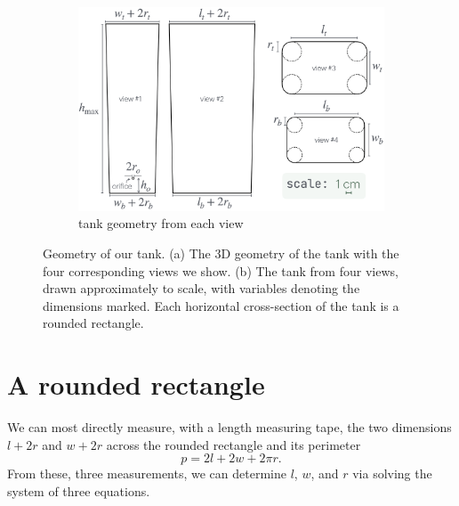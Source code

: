 \documentclass[a4paper,fleqn]{cas-sc}
\begin{document}
\begin{figure}[h!]
	\begin{subfigure}[b]{0.8\textwidth}
		\includegraphics[width=\textwidth]{../drawings_and_photos/tank_geometry.png} \caption{tank geometry from each view}
	\end{subfigure}
	\caption{Geometry of our tank. 
	(a) The 3D geometry of the tank with the four corresponding views we show. (b) The tank from four views, drawn approximately to scale, with variables denoting the dimensions marked. Each horizontal cross-section of the tank is a rounded rectangle.
	} \label{fig:tank_geometry}
\end{figure}

\clearpage

\section{A rounded rectangle}
We can most directly measure, with a length measuring tape, the two dimensions $l+2r$ and $w+2r$ across the rounded rectangle and its perimeter 
\begin{equation}
p = 2 l + 2 w + 2 \pi r.
\end{equation}
From these, three measurements, we can determine $l$, $w$, and $r$ via solving the system of three equations.
\end{document}
